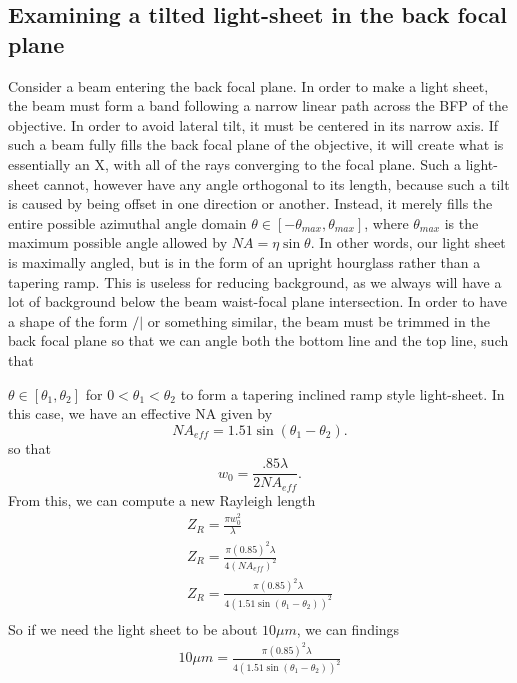 \subsection{Examining a tilted light-sheet in the back focal plane}
Consider a beam entering the back focal plane. In order to make a light sheet, the beam must form a band following a narrow linear path across the BFP of the objective. In order to avoid lateral tilt, it must be centered in its narrow axis. If such a beam fully fills the back focal plane of the objective, it will create what is essentially an X, with all of the rays converging to the focal plane. Such a light-sheet cannot, however have any angle orthogonal to its length, because such a tilt is caused by being offset in one direction or another. Instead, it merely fills the entire possible azimuthal angle domain $\theta \in [-\theta_{max},\theta_{max}]$, where $\theta_{max}$ is the maximum possible angle allowed by $NA=\eta \sin \theta$. In other words, our light sheet is maximally angled, but is in the form of an upright hourglass rather than a tapering ramp. This is useless for reducing background, as we always will have a lot of background below the beam waist-focal plane intersection. In order to have a shape of the form $/|$ or something similar, the beam must be trimmed in the back focal plane so that we can angle both the bottom line and the top line, such that 

$\theta \in [\theta_1, \theta_2]$ for $0<\theta_1<\theta_2$ to form a tapering inclined ramp style light-sheet. In this case, we have an effective NA given by
\begin{equation}
    NA_{eff}=1.51 \sin (\theta_1-\theta_2).
\end{equation}
so that 
\begin{equation}
    w_0 = \frac{.85 \lambda}{2NA_{eff}}.
\end{equation}
From this, we can compute a new Rayleigh length
\begin{gather}
    Z_R = \frac{\pi w_0^2}{\lambda}\\
    Z_R = \frac{\pi (0.85)^2 \lambda}{4 (NA_{eff})^2}\\
    Z_R = \frac{\pi (0.85)^2 \lambda}{4 \left(1.51 \sin (\theta_1-\theta_2)\right)^2}\\
\end{gather}
So if we need the light sheet to be about $10 \mu m$, we can findings
\begin{gather}
    10\mu m = \frac{\pi (0.85)^2 \lambda}{4 (1.51 \sin (\theta_1-\theta_2))^2}
\end{gather}
